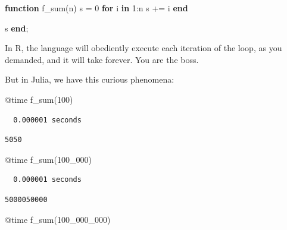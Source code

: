 \documentclass[
  letterpaper,
  DIV=11,
  numbers=noendperiod]{scrartcl}
\newenvironment{Shaded}{\begin{snugshade}}{\end{snugshade}}
\newcommand{\ControlFlowTok}[1]{\textcolor[rgb]{0.00,0.23,0.31}{\textbf{#1}}}
\newcommand{\FloatTok}[1]{\textcolor[rgb]{0.68,0.00,0.00}{#1}}
\newcommand{\FunctionTok}[1]{\textcolor[rgb]{0.28,0.35,0.67}{#1}}
\newcommand{\KeywordTok}[1]{\textcolor[rgb]{0.00,0.23,0.31}{\textbf{#1}}}
\newcommand{\NormalTok}[1]{\textcolor[rgb]{0.00,0.23,0.31}{#1}}
\newcommand{\OperatorTok}[1]{\textcolor[rgb]{0.37,0.37,0.37}{#1}}
\newcommand{\PreprocessorTok}[1]{\textcolor[rgb]{0.68,0.00,0.00}{#1}}
\begin{document}
\begin{Shaded}
\begin{Highlighting}[]
\KeywordTok{function} \FunctionTok{f\_sum}\NormalTok{(n)}
\NormalTok{    s }\OperatorTok{=} \FloatTok{0}
    \ControlFlowTok{for}\NormalTok{ i }\KeywordTok{in} \FloatTok{1}\OperatorTok{:}\NormalTok{n}
\NormalTok{        s }\OperatorTok{+=}\NormalTok{ i}
    \ControlFlowTok{end}

\NormalTok{    s}
\KeywordTok{end}\NormalTok{;}
\end{Highlighting}
\end{Shaded}

In R, the language will obediently execute each iteration of the loop,
as you demanded, and it will take forever. You are the boss.

But in Julia, we have this curious phenomena:

\begin{Shaded}
\begin{Highlighting}[]
\PreprocessorTok{@time} \FunctionTok{f\_sum}\NormalTok{(}\FloatTok{100}\NormalTok{)}
\end{Highlighting}
\end{Shaded}

\begin{verbatim}
  0.000001 seconds
\end{verbatim}

\begin{verbatim}
5050
\end{verbatim}

\begin{Shaded}
\begin{Highlighting}[]
\PreprocessorTok{@time} \FunctionTok{f\_sum}\NormalTok{(}\FloatTok{100\_000}\NormalTok{)}
\end{Highlighting}
\end{Shaded}

\begin{verbatim}
  0.000001 seconds
\end{verbatim}

\begin{verbatim}
5000050000
\end{verbatim}

\begin{Shaded}
\begin{Highlighting}[]
\PreprocessorTok{@time} \FunctionTok{f\_sum}\NormalTok{(}\FloatTok{100\_000\_000}\NormalTok{)}
\end{Highlighting}
\end{Shaded}
\end{document}
